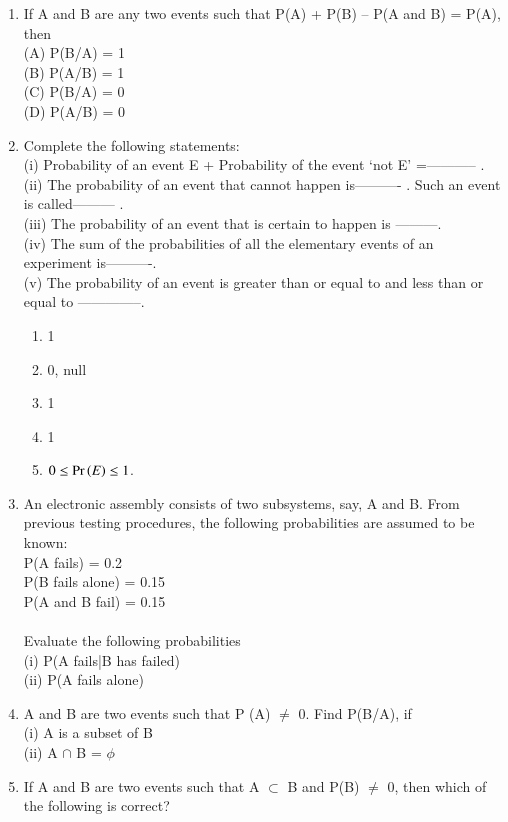\begin{enumerate}[label=\thesection.\arabic*.,ref=\thesection.\theenumi]
\item If A and B are any two events such that P(A) + P(B) – P(A and B) = P(A), then\\
(A) P(B/A) = 1 \\
(B) P(A/B) = 1\\
(C) P(B/A) = 0 \\
(D) P(A/B) = 0\\
\item Complete the following statements:\\
 (i) Probability of an event E + Probability of the event ‘not E’ =----------- .\\
 (ii) The probability of an event that cannot happen is---------- . Such an event is called--------- .\\
 (iii) The probability of an event that is certain to happen is ---------.\\
 (iv) The sum of the probabilities of all the elementary events of an experiment is----------.\\ 
 (v) The probability of an event is greater than or equal to and less than or equal to --------------.\\
 \solution
 \begin{enumerate}
 \item 1
 \item 0, null
 \item 1
 \item 1
 \item $0 \le \Pr\left(E\right) \le 1$.
 \end{enumerate}
 \item An electronic assembly consists of two subsystems, say, A and B. From previous testing procedures, the following probabilities are assumed to be known:\\
P(A fails) = 0.2\\
P(B fails alone) = 0.15\\
P(A and B fail) = 0.15\\
\\Evaluate the following probabilities\\
(i) P(A fails|B has failed) \\
(ii) P(A fails alone)\\
\item A and B are two events such that P (A) $\neq$ 0. Find P(B/A), if\\
(i) A is a subset of B \\
(ii) A $\cap$ B = $\phi$\\
\solution

\item If A and B are two events such that A $\subset$ B and P(B) $\neq$ 0, then which of the following is correct?\\

\end{enumerate}
